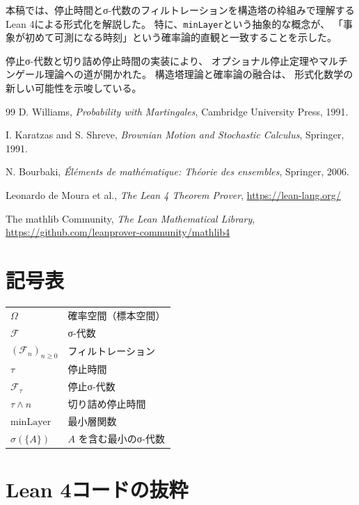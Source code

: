 \documentclass[a4paper,12pt]{ltjsarticle}
\theoremstyle{definition}
\begin{document}
本稿では、停止時間とσ-代数のフィルトレーションを構造塔の枠組みで理解する
Lean 4による形式化を解説した。
特に、\texttt{minLayer}という抽象的な概念が、
「事象が初めて可測になる時刻」という確率論的直観と一致することを示した。

停止σ-代数と切り詰め停止時間の実装により、
オプショナル停止定理やマルチンゲール理論への道が開かれた。
構造塔理論と確率論の融合は、
形式化数学の新しい可能性を示唆している。

\begin{thebibliography}{99}
 D. Williams,
  \textit{Probability with Martingales},
  Cambridge University Press, 1991.

 I. Karatzas and S. Shreve,
  \textit{Brownian Motion and Stochastic Calculus},
  Springer, 1991.

 N. Bourbaki,
  \textit{Éléments de mathématique: Théorie des ensembles},
  Springer, 2006.

 Leonardo de Moura et al.,
  \textit{The Lean 4 Theorem Prover},
  \url{https://lean-lang.org/}

 The mathlib Community,
  \textit{The Lean Mathematical Library},
  \url{https://github.com/leanprover-community/mathlib4}
\end{thebibliography}

\appendix

\section{記号表}

\begin{tabular}{ll}
$\Omega$ & 確率空間（標本空間） \\
$\mathcal{F}$ & σ-代数 \\
$(\mathcal{F}_n)_{n \geq 0}$ & フィルトレーション \\
$\tau$ & 停止時間 \\
$\mathcal{F}_\tau$ & 停止σ-代数 \\
$\tau \wedge n$ & 切り詰め停止時間 \\
$\mathrm{minLayer}$ & 最小層関数 \\
$\sigma(\{A\})$ & $A$ を含む最小のσ-代数 \\
\end{tabular}

\section{Lean 4コードの抜粋}
\end{document}
